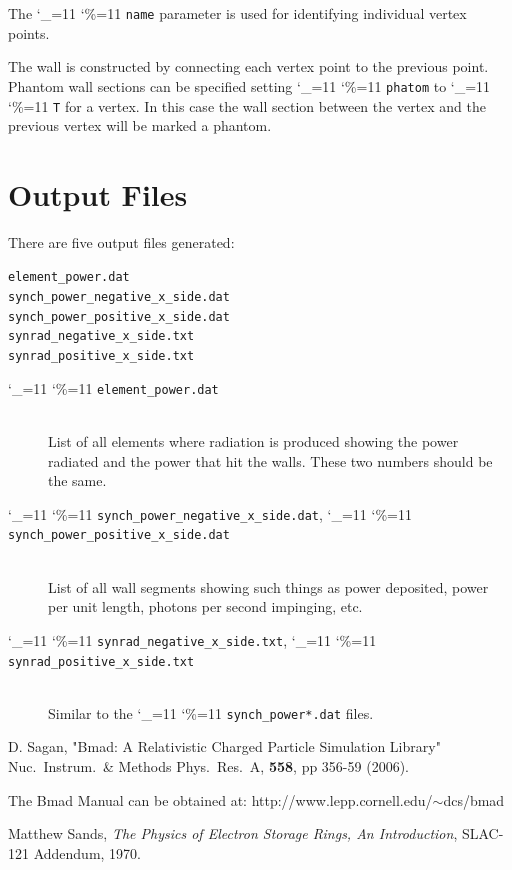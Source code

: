 \documentclass[11pt]{article}
\newcommand\ttcmd{\begingroup\catcode`\_=11 \catcode`\%=11 \dottcmd}
\newcommand\dottcmd[1]{\texttt{#1}\endgroup}
\newcommand{\vn}{\ttcmd}
\newcommand{\Newline}{\hfil \\}
\begin{document}
The \vn{name} parameter is used for identifying individual vertex
points.

The wall is constructed by connecting each vertex point to the
previous point. Phantom wall sections can be specified setting
\vn{phatom} to \vn{T} for a vertex. In this case the wall section
between the vertex and the previous vertex will be marked a phantom.

\section{Output Files} 

There are five output files generated:
\begin{alltt}
  element_power.dat
  synch_power_negative_x_side.dat
  synch_power_positive_x_side.dat
  synrad_negative_x_side.txt
  synrad_positive_x_side.txt
\end{alltt}

  \begin{description}
  \item[\vn{element_power.dat}] \Newline
List of all elements where radiation is produced showing the power radiated and
the power that hit the walls. These two numbers should be the same.
  \item[\vn{synch_power_negative_x_side.dat}, \vn{synch_power_positive_x_side.dat}] \Newline
List of all wall segments showing such things as power deposited, power per unit length, photons
per second impinging, etc.
  \item[\vn{synrad_negative_x_side.txt}, \vn{synrad_positive_x_side.txt}] \Newline
Similar to the \vn{synch_power*.dat} files.
  \end{description}

\begin{thebibliography}{9}

D. Sagan,
"Bmad: A Relativistic Charged Particle Simulation Library"
Nuc.\ Instrum.\ \& Methods Phys.\ Res.\ A, {\bf 558}, pp 356-59 (2006).

The Bmad Manual can be obtained at:\hfill\break
\hspace*{20pt} http://www.lepp.cornell.edu/$\scriptstyle\sim$dcs/bmad

Matthew Sands, {\em The Physics of Electron Storage Rings, An Introduction},
SLAC-121 Addendum, 1970.

\end{thebibliography}
\end{document}

